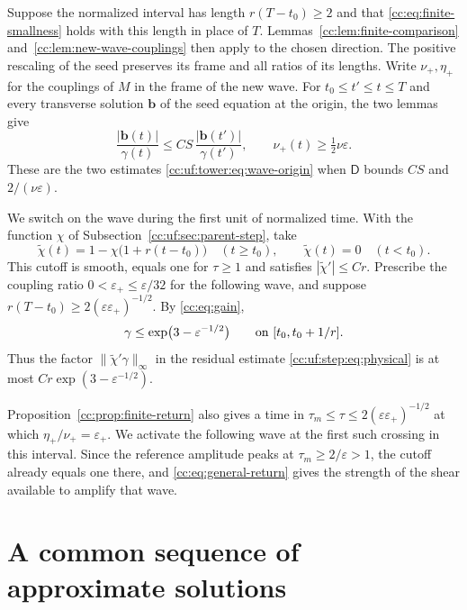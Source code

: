 Suppose the normalized interval has length $r(T-t_0)\ge2$ and that
\eqref{cc:eq:finite-smallness} holds with this length in place of $T$.
Lemmas~\ref{cc:lem:finite-comparison} and~\ref{cc:lem:new-wave-couplings}
then apply to the chosen direction. The positive rescaling of the seed
preserves its frame and all ratios of its lengths. Write
$\nu_+,\eta_+$ for the couplings of $M$ in the frame of the new wave.
For $t_0\le t'\le t\le T$ and every transverse solution $\mathbf b$
of the seed equation at the origin, the two lemmas give
\begin{equation}\label{cc:uf:tower:eq:later-origin}
 \frac{|\mathbf b(t)|}{\gamma(t)}
 \le CS\,\frac{|\mathbf b(t')|}{\gamma(t')},\qquad
 \nu_+(t)\ge\tfrac12\nu\varepsilon.
\end{equation}
These are the two estimates \eqref{cc:uf:tower:eq:wave-origin} when
$\mathsf D$ bounds $CS$ and $2/(\nu\varepsilon)$.

We switch on the wave during the first unit of normalized time. With
the function $\chi$ of Subsection~\ref{cc:uf:sec:parent-step}, take
\[
 \widetilde\chi(t)=1-\chi\bigl(1+r(t-t_0)\bigr)\quad(t\ge t_0),\qquad
 \widetilde\chi(t)=0\quad(t<t_0).
\]
This cutoff is smooth, equals one for $\tau\ge1$ and satisfies
$|\widetilde\chi'|\le Cr$. Prescribe the coupling ratio
$0<\varepsilon_+\le\varepsilon/32$ for the following wave, and suppose
$r(T-t_0)\ge2(\varepsilon\varepsilon_+)^{-1/2}$. By \eqref{cc:eq:gain},
\begin{equation}\label{cc:uf:tower:eq:switch-small}
 \gamma\le\exp\bigl(3-\varepsilon^{-1/2}\bigr)
 \qquad\hbox{on }[t_0,t_0+1/r].
\end{equation}
Thus the factor $\|\widetilde\chi'\gamma\|_\infty$ in the residual
estimate \eqref{cc:uf:step:eq:physical} is at most
$Cr\exp(3-\varepsilon^{-1/2})$.

Proposition~\ref{cc:prop:finite-return} also gives a time in
$\tau_m\le\tau\le2(\varepsilon\varepsilon_+)^{-1/2}$ at which
$\eta_+/\nu_+=\varepsilon_+$. We activate the following wave at the
first such crossing in this interval. Since the reference amplitude
peaks at $\tau_m\ge2/\varepsilon>1$, the cutoff already equals one
there, and \eqref{cc:eq:general-return} gives the strength of the
shear available to amplify that wave.

\section{A common sequence of approximate solutions}\label{cc:uf:sec:tower}

